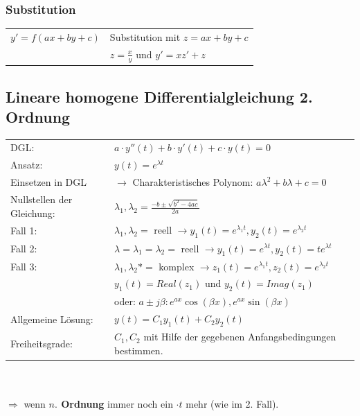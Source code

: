 \subsubsection{Substitution}
\begin{tabular}{p{4cm}p{6cm}}
	$y' = f(ax + by + c)$ & Substitution mit $z = ax + by + c$\\
	& $z = \frac{x}{y}$ und $y' = xz' + z$ \\
\end{tabular}

\subsection{Lineare homogene Differentialgleichung 2. Ordnung}
\begin{tabular}{ll}
	DGL:                       & $a \cdot y''(t) + b \cdot y'(t) + c \cdot y(t) = 0$                                                     \\
	Ansatz:                    & $y(t) = e^{\lambda t}$                                                                                  \\
	Einsetzen in DGL           & $\rightarrow$ Charakteristisches Polynom: $a\lambda^2 + b\lambda +c =0$                                 \\
	Nullstellen der Gleichung: & $\lambda_1,\lambda_2 = \frac{-b \pm \sqrt{b^2 - 4ac}}{2a}$                                              \\
	Fall 1:                    & $\lambda_1,\lambda_2 =$ reell $\rightarrow y_1(t) = e^{\lambda_1 t}, y_2(t) = e^{\lambda_2 t}$          \\
	Fall 2:                    & $\lambda = \lambda_1 = \lambda_2 =$ reell $\rightarrow y_1(t) = e^{\lambda t}, y_2(t) = te^{\lambda t}$ \\
	Fall 3:                    & $\lambda_1,\lambda_2* =$ komplex $\rightarrow z_1(t) = e^{\lambda_1 t}, z_2(t) = e^{\lambda_2 t} $       \\
	                           & $y_1(t) = Real(z_1)$ und $y_2(t) = Imag(z_1)$                                                           \\
	                           & oder: $a \pm j\beta: e^{ax}\cos(\beta x), e^{ax} \sin(\beta x)$\\
	Allgemeine Lösung:         & $y(t) = C_1y_1(t) + C_2y_2(t)$                                                                          \\
	Freiheitsgrade:            & $C_1,C_2$ mit Hilfe der gegebenen Anfangsbedingungen bestimmen.
\end{tabular} \\ \\
$\Rightarrow$ wenn \textbf{$n.$ Ordnung} immer noch ein $\cdot t$ mehr (wie im 2. Fall).\\ 

